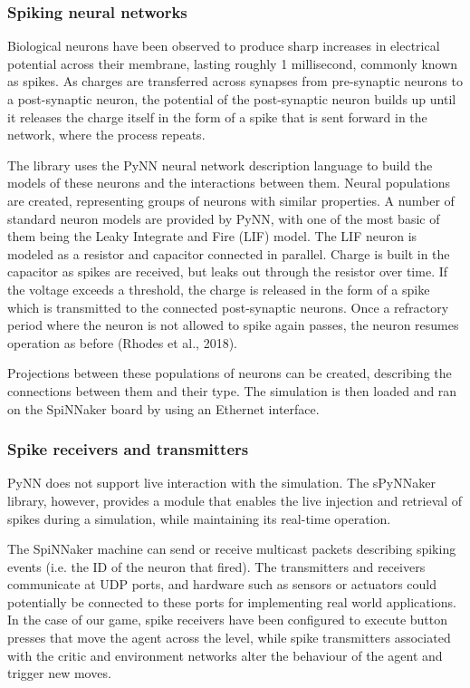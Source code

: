 \documentclass[10pt]{article}
\begin{document}
    \subsubsection{Spiking neural networks}

    Biological neurons have been observed to produce sharp increases in electrical potential across their membrane, lasting roughly 1 millisecond, commonly known as spikes. As charges are transferred across synapses from pre-synaptic neurons to a post-synaptic neuron, the potential of the post-synaptic neuron builds up until it releases the charge itself in the form of a spike that is sent forward in the network, where the process repeats.

    The library uses the PyNN neural network description language to build the models of these neurons and the interactions between them. Neural populations are created, representing groups of neurons with similar properties. A number of standard neuron models are provided by PyNN, with one of the most basic of them being the Leaky Integrate and Fire (LIF) model. The LIF neuron is modeled as a resistor and capacitor connected in parallel. Charge is built in the capacitor as spikes are received, but leaks out through the resistor over time. If the voltage exceeds a threshold, the charge is released in the form of a spike which is transmitted to the connected post-synaptic neurons. Once a refractory period where the neuron is not allowed to spike again passes, the neuron resumes operation as before (Rhodes et al., 2018). 
    
    Projections between these populations of neurons can be created, describing the connections between them and their type. The simulation is then loaded and ran on the SpiNNaker board by using an Ethernet interface.

    \subsubsection{Spike receivers and transmitters}

    PyNN does not support live interaction with the simulation. The sPyNNaker library, however, provides a module that enables the live injection and retrieval of spikes during a simulation, while maintaining its real-time operation.

    The SpiNNaker machine can send or receive multicast packets describing spiking events (i.e. the ID of the neuron that fired). The transmitters and receivers communicate at UDP ports, and hardware such as sensors or actuators could potentially be connected to these ports for implementing real world applications. In the case of our game, spike receivers have been configured to execute button presses that move the agent across the level, while spike transmitters associated with the critic and environment networks alter the behaviour of the agent and trigger new moves.
\end{document}

